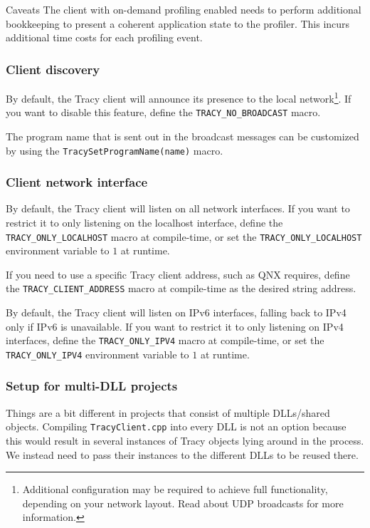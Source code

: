 \documentclass[hidelinks,titlepage,a4paper,twoside]{article}
\begin{document}
\begin{bclogo}[
noborder=true,
couleur=black!5,
logo=\bcattention
]{Caveats}
The client with on-demand profiling enabled needs to perform additional bookkeeping to present a coherent application state to the profiler. This incurs additional time costs for each profiling event.
\end{bclogo}

\subsubsection{Client discovery}

By default, the Tracy client will announce its presence to the local network\footnote{Additional configuration may be required to achieve full functionality, depending on your network layout. Read about UDP broadcasts for more information.}. If you want to disable this feature, define the \texttt{TRACY\_NO\_BROADCAST} macro.

The program name that is sent out in the broadcast messages can be customized by using the \texttt{TracySetProgramName(name)} macro.

\subsubsection{Client network interface}

By default, the Tracy client will listen on all network interfaces. If you want to restrict it to only listening on the localhost interface, define the \texttt{TRACY\_ONLY\_LOCALHOST} macro at compile-time, or set the \texttt{TRACY\_ONLY\_LOCALHOST} environment variable to $1$ at runtime.

If you need to use a specific Tracy client address, such as QNX requires, define the \texttt{TRACY\_CLIENT\_ADDRESS} macro at compile-time as the desired string address.

By default, the Tracy client will listen on IPv6 interfaces, falling back to IPv4 only if IPv6 is unavailable. If you want to restrict it to only listening on IPv4 interfaces, define the \texttt{TRACY\_ONLY\_IPV4} macro at compile-time, or set the \texttt{TRACY\_ONLY\_IPV4} environment variable to $1$ at runtime.

\subsubsection{Setup for multi-DLL projects}
\label{multidll}

Things are a bit different in projects that consist of multiple DLLs/shared objects. Compiling \texttt{TracyClient.cpp} into every DLL is not an option because this would result in several instances of Tracy objects lying around in the process. We instead need to pass their instances to the different DLLs to be reused there.
\end{document}
